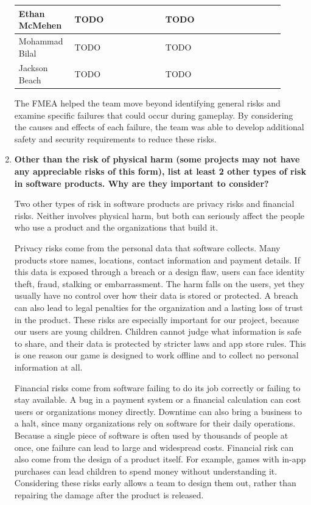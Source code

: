 \documentclass{article}
\newcounter{sr}
\begin{document}
\begin{enumerate}
\begin{longtable}{@{}
        p{0.17\linewidth}
        p{0.32\linewidth}
        p{0.42\linewidth}
    @{}}
    Ethan McMehen &
    TODO
    &
    TODO \\
    \midrule

    Mohammad Bilal &
    TODO
    &
    TODO \\
    \midrule

    Jackson Beach &
    TODO
    &
    TODO \\

    \bottomrule
    \end{longtable}

    The FMEA helped the team move beyond identifying
    general risks and examine specific failures that
    could occur during gameplay. By considering the
    causes and effects of each failure, the team was
    able to develop additional safety and security
    requirements to reduce these risks.

    \item \textbf{Other than the risk of physical harm (some projects may not
    have any appreciable risks of this form), list at least 2 other types of risk
    in software products. Why are they important to consider?}

    Two other types of risk in software products are privacy risks and financial
    risks. Neither involves physical harm, but both can seriously affect the people
    who use a product and the organizations that build it.

    Privacy risks come from the personal data that software collects. Many
    products store names, locations, contact information and payment details. If
    this data is exposed through a breach or a design flaw, users can face
    identity theft, fraud, stalking or embarrassment. The harm falls on the users,
    yet they usually have no control over how their data is stored or protected.
    A breach can also lead to legal penalties for the organization and a lasting
    loss of trust in the product. These risks are especially important for our
    project, because our users are young children. Children cannot judge what
    information is safe to share, and their data is protected by stricter laws and
    app store rules. This is one reason our game is designed to work offline and
    to collect no personal information at all.

    Financial risks come from software failing to do its job correctly or failing
    to stay available. A bug in a payment system or a financial calculation can
    cost users or organizations money directly. Downtime can also bring a business
    to a halt, since many organizations rely on software for their daily
    operations. Because a single piece of software is often used by thousands of
    people at once, one failure can lead to large and widespread costs. Financial
    risk can also come from the design of a product itself. For example, games
    with in-app purchases can lead children to spend money without understanding
    it. Considering these risks early allows a team to design them out, rather
    than repairing the damage after the product is released.
\end{enumerate}

\newpage



\end{document}

